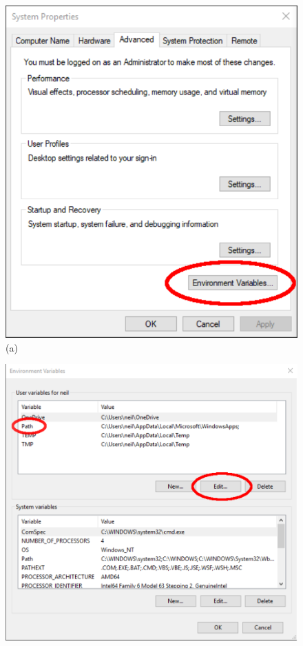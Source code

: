 \begin{figure}
\begin{center}
\begin{minipage}[t]{.29\textwidth}
\begin{center}
\includegraphics[width=\textwidth]{Figures/win/Win1.pdf}
(a)
\end{center}
\end{minipage}
\begin{minipage}[t]{.29\textwidth}
\begin{center}
\includegraphics[width=\textwidth]{Figures/win/Win2.pdf}

\end{center}
\end{minipage}
\end{center}
\end{figure}
